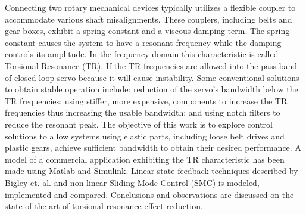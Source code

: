 Connecting two rotary mechanical devices typically utilizes a flexible coupler to accommodate various shaft misalignments. 
These couplers, including belts and gear boxes, exhibit a spring constant and a viscous damping term. 
The spring constant causes the system to have a resonant frequency while the damping controls its amplitude. 
In the frequency domain this characteristic is called Torsional Resonance (TR). 
If the TR frequencies are allowed into the pass band of closed loop servo because it will cause instability.
Some conventional solutions to obtain stable operation include: reduction of the servo's bandwidth below the TR frequencies; using stiffer, more expensive, components to increase the TR frequencies thus increasing the usable bandwidth; and using notch filters to reduce the resonant peak.
The objective of this work is to explore control solutions to allow systems using elastic parts, including loose belt drives and plastic gears, achieve sufficient bandwidth to obtain their desired performance. 
A model of a commercial application exhibiting the TR characteristic has been made using Matlab and Simulink.
Linear state feedback techniques described by Bigley et. al. and non-linear Sliding Mode Control (SMC) is modeled, implemented and compared.
Conclusions and observations are discussed on the state of the art of torsional resonance effect reduction. 